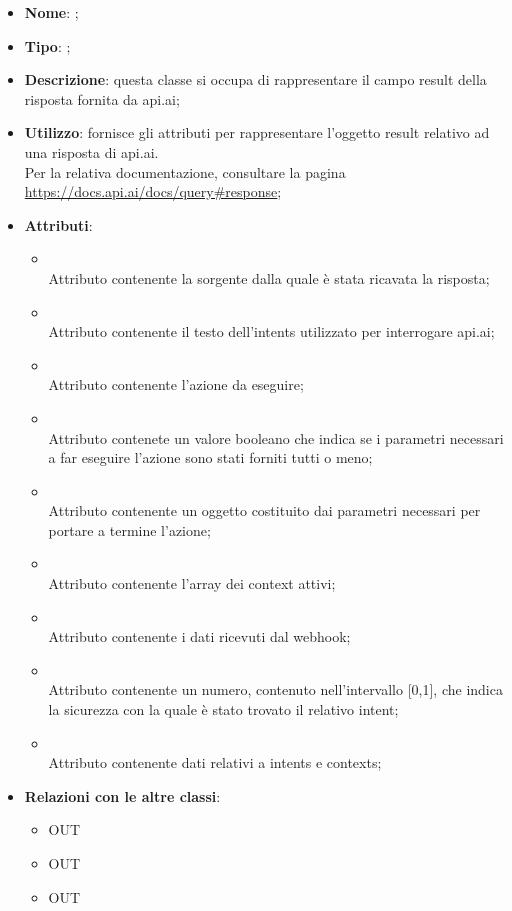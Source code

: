 \begin{itemize}
	\item \textbf{Nome}: ;
	\item \textbf{Tipo}: ;
	\item \textbf{Descrizione}: questa classe si occupa di rappresentare il campo result della risposta fornita da api.ai;
	\item \textbf{Utilizzo}: fornisce gli attributi per rappresentare l'oggetto result relativo ad una risposta di api.ai. \\
Per la relativa documentazione, consultare la pagina \url{https://docs.api.ai/docs/query#response};
	\item \textbf{Attributi}:
	\begin{itemize}
		\item[]  \\
		Attributo contenente la sorgente dalla quale è stata ricavata la risposta;
		\item[]  \\
		Attributo contenente il testo dell'intents utilizzato per interrogare api.ai;
		\item[]  \\
		Attributo contenente l'azione da eseguire;
		\item[]  \\
		Attributo contenete un valore booleano che indica se i parametri necessari a far eseguire l'azione sono stati forniti tutti o meno;
		\item[]  \\
		Attributo contenente un oggetto costituito dai parametri necessari per portare a termine l'azione;
		\item[]  \\
		Attributo contenente l'array dei context attivi;
		\item[]  \\
		Attributo contenente i dati ricevuti dal webhook;
		\item[]  \\
		Attributo contenente un numero, contenuto nell'intervallo [0,1], che indica la sicurezza con  la quale è stato trovato il relativo intent;
		\item[]  \\
		Attributo contenente dati relativi a intents e contexts;
	\end{itemize}
	\item \textbf{Relazioni con le altre classi}:
	\begin{itemize}
		\item OUT \hyperlink{Context_label}{}
		\item OUT \hyperlink{Metadata_label}{}
		\item OUT \hyperlink{Fulfillment_label}{}
	\end{itemize}
\end{itemize}
\FloatBarrier

